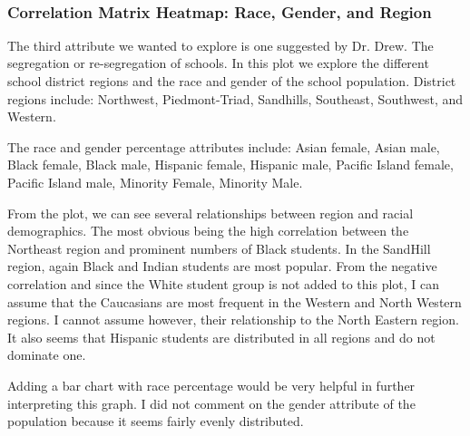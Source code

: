 \documentclass[11pt]{article}
\begin{document}
    \begin{center}
    \end{center}
    { \hspace*{\fill} \\}
    
    \subsubsection{Correlation Matrix Heatmap: Race, Gender, and
Region}\label{correlation-matrix-heatmap-race-gender-and-region}

The third attribute we wanted to explore is one suggested by Dr. Drew.
The segregation or re-segregation of schools. In this plot we explore
the different school district regions and the race and gender of the
school population. District regions include: Northwest, Piedmont-Triad,
Sandhills, Southeast, Southwest, and Western.

The race and gender percentage attributes include: Asian female, Asian
male, Black female, Black male, Hispanic female, Hispanic male, Pacific
Island female, Pacific Island male, Minority Female, Minority Male.

From the plot, we can see several relationships between region and
racial demographics. The most obvious being the high correlation between
the Northeast region and prominent numbers of Black students. In the
SandHill region, again Black and Indian students are most popular. From
the negative correlation and since the White student group is not added
to this plot, I can assume that the Caucasians are most frequent in the
Western and North Western regions. I cannot assume however, their
relationship to the North Eastern region. It also seems that Hispanic
students are distributed in all regions and do not dominate one.

Adding a bar chart with race percentage would be very helpful in further
interpreting this graph. I did not comment on the gender attribute of
the population because it seems fairly evenly distributed.
\end{document}
